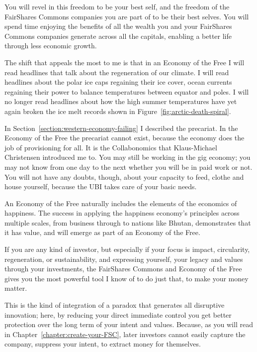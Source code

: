 You will revel in this freedom  to be your best self, and the freedom of the FairShares Commons  companies you are part of to be their best selves. You will spend time enjoying the benefits of all the wealth you and your FairShares Commons companies generate across all the capitals, enabling a better life through less economic growth\cite{hickel-less}. 


The shift that appeals the most to me is that in an Economy of the Free I will read headlines that talk about the regeneration of our climate. I will read headlines about the polar ice caps  regaining their ice cover, ocean currents regaining their power to balance temperatures between equator and poles. I will no longer read headlines about how the high summer temperatures have yet again broken the ice melt records shown in Figure~\ref{fig:arctic-death-spiral}.


In Section~\ref{section:western-economy-failing} I described the precariat.  In the Economy of the Free the precariat cannot exist, because the economy does the job of provisioning for all. It is the Collabonomics that Klaus-Michael Christensen introduced me to. You may still be working in the gig economy; you may not know from one day to the next whether you will be in paid work or not. You will not have any doubts, though, about your capacity to feed, clothe and house yourself, because the UBI\cite{standing-basic-income} takes care of your basic needs.


An Economy of the Free naturally includes the elements of the economics of happiness\cite{anielski-economics-happiness}. The success in applying the happiness economy’s principles across multiple scales, from business through to nations like Bhutan, demonstrates that it has value, and will emerge as part of an Economy of the Free.


If you are any kind of investor, but especially if your focus is impact, circularity, regeneration, or sustainability, and expressing yourself, your legacy and values through your investments, the FairShares Commons and Economy of the Free gives you the most powerful tool I know of to do just that, to make your money matter. 


This is the kind of integration of a paradox that generates all disruptive innovation; here, by reducing your direct immediate control you get better protection over the long term of your intent and values. Because, as you will read in Chapter~\ref{chapter:create-your-FSC}, later investors cannot easily capture the company, suppress your intent, to extract money for themselves.